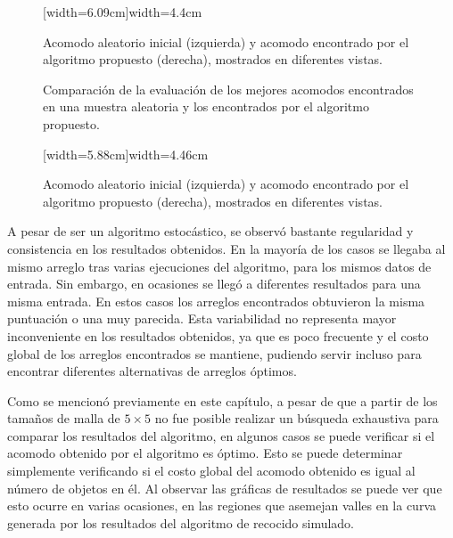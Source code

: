 \vfill%
\begin{figure}[H]
	[width=6.09cm]{width=4.4cm}%
	\caption{Acomodo aleatorio inicial (izquierda) y acomodo encontrado por el algoritmo propuesto (derecha), mostrados en diferentes vistas.}%
\end{figure}
%
\setlength\intextsep{6pt}
\begin{figure}[H]
	\caption{Comparación de la evaluación de los mejores acomodos encontrados en una muestra aleatoria y los encontrados por el algoritmo propuesto.}%
\end{figure}
\vfill%
\begin{figure}[H]
	[width=5.88cm]{width=4.46cm}%
	\caption{Acomodo aleatorio inicial (izquierda) y acomodo encontrado por el algoritmo propuesto (derecha), mostrados en diferentes vistas.}%
\end{figure}
\setlength{\intextsep}{\oldintextsep}%
%
A pesar de ser un algoritmo estocástico, se observó bastante regularidad y consistencia en los resultados obtenidos.
En la mayoría de los casos se llegaba al mismo arreglo tras varias ejecuciones del algoritmo, para los mismos datos de entrada.
Sin embargo, en ocasiones se llegó a diferentes resultados para una misma entrada.
En estos casos los arreglos encontrados obtuvieron la misma puntuación o una muy parecida.
Esta variabilidad no representa mayor inconveniente en los resultados obtenidos, ya que es poco frecuente y el costo global de los arreglos encontrados se mantiene, pudiendo servir incluso para encontrar diferentes alternativas de arreglos óptimos.

Como se mencionó previamente en este capítulo, a pesar de que a partir de los tamaños de malla de $5\times 5$ no fue posible realizar un búsqueda exhaustiva para comparar los resultados del algoritmo, en algunos casos se puede verificar si el acomodo obtenido por el algoritmo es óptimo.
Esto se puede determinar simplemente verificando si el costo global del acomodo obtenido es igual al número de objetos en él.
Al observar las gráficas de resultados se puede ver que esto ocurre en varias ocasiones, en las regiones que asemejan valles en la curva generada por los resultados del algoritmo de recocido simulado.


